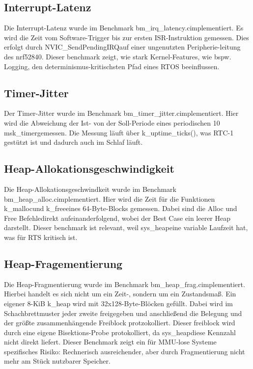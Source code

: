 \subsection{Interrupt-Latenz}

Die Interrupt-Latenz wurde im Benchmark bm\_irq\_latency.cimplementiert. Es wird die Zeit vom Software-Trigger bis zur ersten ISR-Instruktion gemessen. Dies erfolgt durch NVIC\_SendPendingIRQauf einer ungenutzten Peripherie-leitung des nrf52840. Dieser benchmark zeigt, wie stark Kernel-Features, wie bspw. Logging, den determinismus-kritischsten Pfad eines RTOS beeinflussen.

\subsection{Timer-Jitter}

Der Timer-Jitter wurde im Benchmark bm\_timer\_jitter.cimplementiert. Hier wird die Abweichung der Ist- von der Soll-Periode eines periodischen 10 msk\_timergemessen. Die Messung läuft über k\_uptime\_ticks(), was RTC-1 gestützt ist und dadurch auch im Schlaf läuft.

\subsection{Heap-Allokationsgeschwindigkeit}

Die Heap-Allokationsgeschwindkeit wurde im Benchmark bm\_heap\_alloc.cimplementiert. Hier wird die Zeit für die Funktionen k\_mallocund k\_freeeines 64-Byte-Blocks gemessen. Dabei sind die Alloc und Free Befehledirekt aufeinanderfolgend, wobei der Best Case ein leerer Heap darstellt. Dieser benchmark ist relevant, weil sys\_heapeine variable Laufzeit hat, was für RTS kritisch ist.

\subsection{Heap-Fragementierung}

Die Heap-Fragmentierung wurde im Benchmark bm\_heap\_frag.cimplementiert. Hierbei handelt es sich nicht um ein Zeit-, sondern um ein Zustandsmaß. Ein eigener 8-KiB k\_heap wird mit 32x128-Byte-Blöcken gefüllt. Dabei wird im Schachbrettmuster jeder zweite freigegeben und anschließend die Belegung und der größte zusammenhängende Freiblock protzokolliert. Dieser freiblock wird durch eine eigene Bisektions-Probe protokolliert, da sys\_heapdiese Kennzahl nicht direkt liefert. Dieser Benchmark zeigt ein für MMU-lose Systeme spezifisches Risiko: Rechnerisch ausreichender, aber durch Fragmentierung nicht mehr am Stück nutzbarer Speicher.

